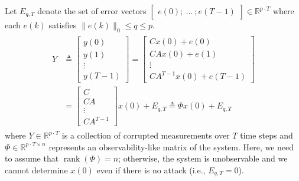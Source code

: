 \documentclass[12pt, conference, a4paper, twoside]{IEEEconf_mod}
\begin{document}
Let $E_{q,T}$ denote the set of error vectors $\begin{bmatrix} e(0); ~ ...~  ;  e(T-1) \end{bmatrix}   \in  \mathbb{R}^{p\cdot T} $ where each $e(k)$ satisfies $\|e(k)\|_0 \leq q \leq p$. %
\begin{eqnarray} \label{eq:sys_err_corr}
\begin{aligned}
	Y &\triangleq \begin{bmatrix} y(0) \\ y(1) \\ \vdots \\ y(T-1) \end{bmatrix}  = \begin{bmatrix} Cx(0) + e(0)\\ CA x(0) + e(1) \\ \vdots \\ CA^{T-1} x(0) + e(T-1) \end{bmatrix} \\
		& =
		\begin{bmatrix} C \\ CA \\ \vdots \\ CA^{T-1} \end{bmatrix} x(0) + E_{q,T}  \triangleq \Phi x(0) + E_{q,T}
		\label{eq:decoder_Phi}
\end{aligned}
\end{eqnarray}
where $Y \in \mathbb{R}^{p\cdot T}$ is a collection of corrupted measurements over $T$ time steps and $\Phi \in \mathbb{R}^{p\cdot T \times n}$ represents an observability-like matrix of the system. %
Here, we need to assume that $\operatorname{rank}(\Phi) = n$; otherwise, the system is unobservable and we cannot determine $x(0)$ even if there is no attack (i.e., $E_{q,T} = 0$).
\end{document}
